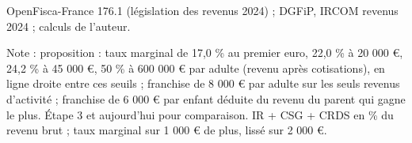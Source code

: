 OpenFisca-France 176.1 (législation des revenus 2024) ; DGFiP, IRCOM revenus 2024 ; calculs de l'auteur.\par Note : proposition : taux marginal de 17,0 \% au premier euro, 22,0 \% à 20 000 \euro{}, 24,2 \% à 45 000 \euro{}, 50 \% à 600 000 \euro{} par adulte (revenu après cotisations), en ligne droite entre ces seuils ; franchise de 8 000 \euro{} par adulte sur les seuls revenus d'activité ; franchise de 6 000 \euro{} par enfant déduite du revenu du parent qui gagne le plus. Étape 3 et aujourd'hui pour comparaison. IR + CSG + CRDS en \% du revenu brut ; taux marginal sur 1 000 \euro{} de plus, lissé sur 2 000 \euro{}.
